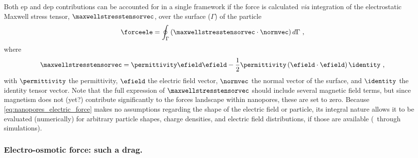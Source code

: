 Both \gls{ep} and \gls{dep} contributions can be accounted for in a single framework if the force is
calculated \textit{via} integration of the electrostatic Maxwell stress tensor, $\maxwellstresstensorvec$,
over the surface ($\Gamma$) of the particle~\cite{Ai-2011}
%
\begin{equation}\label{eq:nanopores_electric_force}
  \forceele = \oint_{\Gamma} \left( \maxwellstresstensorvec \cdot \normvec \right) d\Gamma
  \text{ ,}
\end{equation}
%
where
%
\begin{equation}\label{eq:nanopores_maxwell_stresstensor}
  \maxwellstresstensorvec = \permittivity \efield \efield
                            - \dfrac{1}{2} \permittivity \left( \efield \cdot \efield \right) \identity
  \text{ ,}
\end{equation}
%
with $\permittivity$ the permittivity, $\efield$ the electric field vector, $\normvec$ the normal vector of
the surface, and $\identity$ the identity tensor vector. Note that the full expression of
$\maxwellstresstensorvec$ should include several magnetic field terms, but since magnetism does not (yet?)
contribute significantly to the forces landscape within nanopores, these are set to zero. Because
\cref{eq:nanopores_electric_force} makes no assumptions regarding the shape of the electric field or particle,
its integral nature allows it to be evaluated (numerically) for arbitrary particle shapes, charge densities,
and electric field distributions, if those are available (\eg~through simulations).


\subsubsection{Electro-osmotic force: such a drag.}
%

